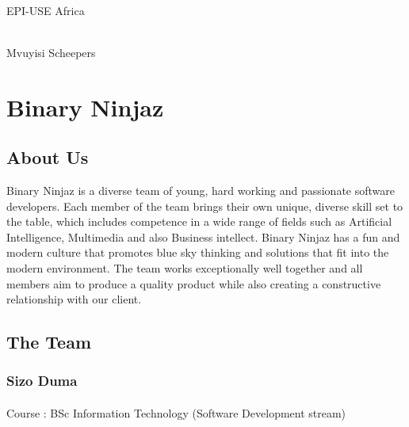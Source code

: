 \documentclass[11pt]{article}
\begin{document}
\begin{titlepage}
\begin{center}
		\begin{minipage}{0.4\textwidth}
			\begin{flushleft} \large
				\emph{} \\
				EPI-USE Africa
			\end{flushleft}
		\end{minipage}
		\begin{minipage}{0.4\textwidth}
			\begin{flushright} \large
				\emph{} \\
				Mvuyisi Scheepers
			\end{flushright}
			\newline
		\end{minipage}
	\end{center}
\end{titlepage}

\newpage
\tableofcontents
\newpage

\section{Binary Ninjaz}
\subsection{About Us}
Binary Ninjaz is a diverse team of young, hard working and passionate software developers. Each member of the team brings their own unique, diverse skill set to the table, which includes competence in a wide range of fields such as Artificial Intelligence, Multimedia and also Business intellect. Binary Ninjaz has a fun and modern culture that promotes blue sky thinking and solutions that fit into the modern environment. The team works exceptionally well together and all members aim to produce a quality product while also creating a constructive relationship with our client.


\subsection{The Team}




\subsubsection{Sizo Duma} 
\paragraph{}Course : BSc Information Technology (Software Development stream)
\end{document}
